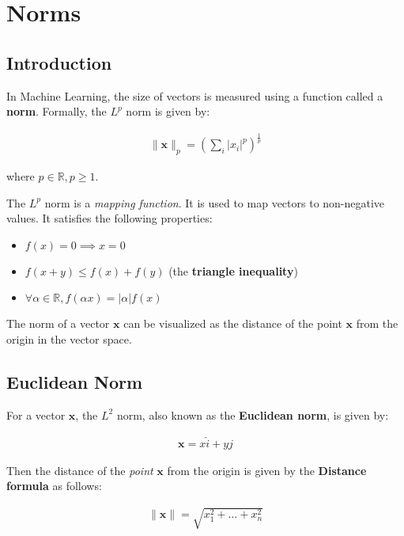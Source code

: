 \chapter{Norms}

\section{Introduction}

In Machine Learning, the size of vectors is measured using a function called a \textbf{norm}. Formally, the \( L^{p} \) norm is given by:

\begin{align}
\|\mathbf{x}\|_{p} = \left( \sum_{i} \left| x_{i} \right| ^{p} \right) ^ {\frac {1}{p}}
\end{align}

where \( p \in \mathbb{R}, p \ge 1 \).
\para

The \( L^{p} \) norm is a \textit{mapping function}. It is used to map vectors to non-negative values. It satisfies the following properties:

\begin{itemize}
    \item \( f(x) = 0 \implies x = 0 \)
    \item \( f(x+y) \le f(x) + f(y) \) (the \textbf{triangle inequality})
    \item \( \forall \alpha \in \mathbb{R}, f(\alpha x) = \left| \alpha \right| f(x) \)
\end{itemize}

The norm of a vector \(\mathbf{x}\) can be visualized as the distance of the point \(\mathbf{x}\) from the origin in the vector space.

\clearpage
\newpage

\section{Euclidean Norm}

For a vector \(\mathbf{x}\), the \(L^{2}\) norm, also known as the \textbf{Euclidean norm}, is given by:

\begin{align}
\mathbf{x} = x \hat{i} + y \hat{j}
\end{align}

Then the distance of the \textit{point} \(\mathbf{x}\) from the origin is given by the \textbf{Distance formula} as follows:

\begin{align}
\|\mathbf{x}\| = \sqrt{x_{1}^2 + \dots + x_{n}^2}
\end{align}
\para

